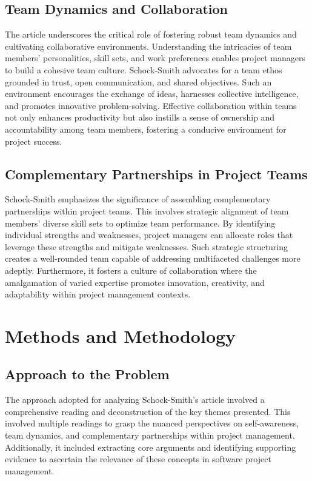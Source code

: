 \documentclass[runningheads]{llncs}
\begin{document}
\subsection{Team Dynamics and Collaboration}
The article underscores the critical role of fostering robust team dynamics and cultivating collaborative environments. Understanding the intricacies of team members' personalities, skill sets, and work preferences enables project managers to build a cohesive team culture. Schock-Smith advocates for a team ethos grounded in trust, open communication, and shared objectives. Such an environment encourages the exchange of ideas, harnesses collective intelligence, and promotes innovative problem-solving. Effective collaboration within teams not only enhances productivity but also instills a sense of ownership and accountability among team members, fostering a conducive environment for project success.

\subsection{Complementary Partnerships in Project Teams}
Schock-Smith emphasizes the significance of assembling complementary partnerships within project teams. This involves strategic alignment of team members' diverse skill sets to optimize team performance. By identifying individual strengths and weaknesses, project managers can allocate roles that leverage these strengths and mitigate weaknesses. Such strategic structuring creates a well-rounded team capable of addressing multifaceted challenges more adeptly. Furthermore, it fosters a culture of collaboration where the amalgamation of varied expertise promotes innovation, creativity, and adaptability within project management contexts.

\section{Methods and Methodology}

\subsection{Approach to the Problem}
The approach adopted for analyzing Schock-Smith's article involved a comprehensive reading and deconstruction of the key themes presented. This involved multiple readings to grasp the nuanced perspectives on self-awareness, team dynamics, and complementary partnerships within project management. Additionally, it included extracting core arguments and identifying supporting evidence to ascertain the relevance of these concepts in software project management.
\end{document}
